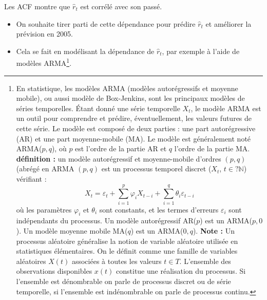 \begin{itemize}
Les ACF montre que $\hat{r}_{t}$ est corrélé avec son passé.
\begin{itemize}
\item On souhaite tirer parti de cette dépendance pour prédire $\hat{r}_{t}$ et améliorer la prévision en 2005.
\item Cela se fait en modélisant la dépendance de $\hat{r}_{t}$, par exemple à l'aide de modèles ARMA\footnote{
En statistique, les modèles ARMA (modèles autorégressifs et moyenne mobile), ou aussi modèle de Box-Jenkins, sont les principaux modèles de séries temporelles.\newline
Étant donné une série temporelle $X_{t}$, le modèle ARMA est un outil pour comprendre et prédire, éventuellement, les valeurs futures de cette série.\newline 
Le modèle est composé de deux parties : une part autorégressive (AR) et une part moyenne-mobile (MA). 
Le modèle est généralement noté ARMA($p,q$), où $p$ est l'ordre de la partie AR et $q$ l'ordre de la partie MA.\newline
\\
\textbf{définition :} un modèle autorégressif et moyenne-mobile d'ordres $(p,q)$ (abrégé en ARMA $(p,q)$ est un processus temporel discret ($X_{t}$, $t\in?\mathbb{N}$) vérifiant :
$$X_t = \varepsilon_{t} +  \sum_{i=1}^{p} \varphi_{i} X_{t-i} + \sum_{i=1}^{q} \theta_{i} \varepsilon_{t-i}$$
où les paramètres $\varphi_{i}$ et $\theta_{i}$ sont constants, et les termes d'erreurs $\varepsilon_{i}$ sont indépendants du processus.
Un modèle autorégressif AR($p$) est un ARMA($p,0$). Un modèle moyenne mobile MA($q$) est un ARMA($0,q$).\newline
\textbf{Note : } Un processus aléatoire généralise la notion de variable aléatoire utilisée en statistiques élémentaires. On le définit comme une famille de variables aléatoires $X(t)$ associées à toutes les valeurs $t\in T$. L'ensemble des observations disponibles $x(t)$ constitue une réalisation du processus.\newline
Si l'ensemble  est dénombrable on parle de processus discret ou de série temporelle, si l'ensemble est indénombrable on parle de processus continu.
}.
\end{itemize}
\end{itemize}






\newpage



